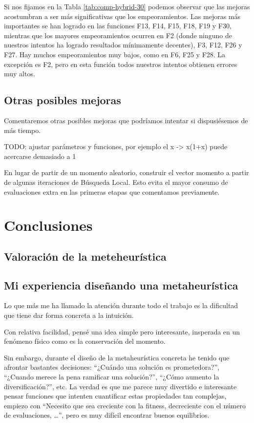 \documentclass{article}
\begin{document}
Si nos fijamos en la Tabla \ref{tab:comp-hybrid-30} podemos observar que las mejoras acostumbran a ser más significativas que los
 empeoramientos. Las mejoras más importantes se han logrado en las funciones F13, F14, F15, F18, F19 y F30, mientras que los
 mayores empeoramientos ocurren en F2 (donde ninguno de nuestros intentos ha logrado resultados mínimamente decentes), F3, F12, F26
 y F27. Hay muchos empeoramientos muy bajos, como en F6, F25 y F28. La excepción es F2, pero en esta función todos nuestros intentos
 obtienen errores muy altos.

\subsection{Otras posibles mejoras}

Comentaremos otras posibles mejoras que podríamos intentar si dispusiésemos de más tiempo.

TODO: ajustar parámetros y funciones, por ejemplo el x -> x(1+x) puede acercarse demasiado a 1

En lugar de partir de un momento aleatorio, construir el vector momento a partir de algunas iteraciones de Búsqueda Local. Esto evita
el mayor consumo de evaluaciones extra en las primeras etapas que comentamos previamente. 

\section{Conclusiones}

\subsection{Valoración de la meteheurística}

\subsection{Mi experiencia diseñando una metaheurística}

Lo que más me ha llamado la atención durante todo el trabajo es la dificultad que tiene dar forma concreta a la intuición.

Con relativa facilidad, pensé una idea simple pero interesante, insperada en un fenómeno físico como es la conservación del momento.

Sin embargo, durante el diseño de la metaheurística concreta he tenido que afrontar bastantes decisiones: ``¿Cuándo una solución es prometedora?'', ``¿Cuando merece la pena ramificar una solución?'', ``¿Cómo aumento la diversificación?'', etc. La verdad es que me parece muy divertido e interesante pensar
 funciones que intenten cuantificar estas propiedades tan complejas, empiezo con ``Necesito que sea creciente con la fitness, decreciente
 con el número de evaluaciones, \ldots'', pero es muy difícil encontrar buenos equilibrios.
\end{document}

